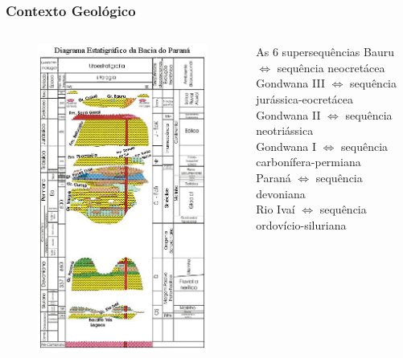 \documentclass[aspectratio=10]{beamer} %
\begin{document}
\begin{frame}
\frametitle{Contexto Geológico}
\begin{columns}


\begin{column}{0.4\textwidth}
\begin{figure}
\includegraphics[scale=0.4]{Imagens/diagrama.png}
\end{figure}
\end{column}

\begin{column}{0.75\textwidth}
\begin{block}{As $6$ supersequências}
Bauru $\Longleftrightarrow$  sequência neocretácea\\
Gondwana III $\Longleftrightarrow$ sequência jurássica-eocretácea\\
Gondwana II $\Longleftrightarrow$ sequência neotriássica \\
Gondwana I $\Longleftrightarrow$ sequência carbonífera-permiana\\ 
Paraná $\Longleftrightarrow$ sequência devoniana\\
Rio Ivaí $\Longleftrightarrow$ sequência ordovício-siluriana\\
\cite{Vail_1977,assine_1994,milani_orogenias_1998}
\end{block}


\end{column}
\end{columns}
\end{frame}
\end{document}
